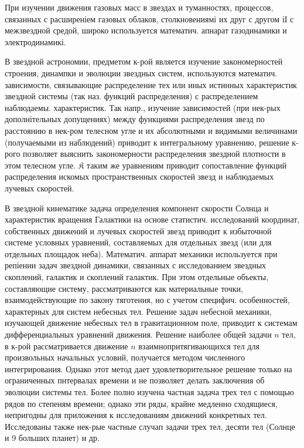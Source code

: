 \documentclass[10pt]{article}
\begin{document}
При изучении движения газовых масс в звездах и туманностях, процессов, связанных с расширеніем газовых облаков, столкновениямі их друг с другом іІ с межзвездной средой, широко используется математич. апнарат газодинамики и электродинамикі.



В звездной астрономии, предметом к-рой является изучение закономерностей строения, динампки и эволюции звездных систем, используются математич. зависимости, связывающие распределение тех или иных истинных характеристик звездной системы (так наз. функций распределения) с распределением наблюдаемы. характеристик. Так напр., изучение зависимостей (при нек-рых дополнітельных допущениях) между функциями распределения звезд по расстоянию в нек-ром телесном угле и их абсолютными и видимыми величинами (получаемыми из наблюдений) приводит к интегральному уравнению, решение к-рого позволяет выяснить закономерности распределения звездной плотности в этом телесном угле. $\mathfrak{K}$ таким же уравнениям приводит сопоставление функций распределения искомых пространственных скоростей звезд и наблюдаемых лучевых скоростей.



В звездной кинематике задача определения компонент скорости Солнца и характеристик вращения Галактики на основе статистич. исследований координат, собственных движений и лучевых скоростей звезд приводит к избыточной системе условных уравнений, составляемых для отдельных звезд (или для отдельных площадок неба). Математич. аппарат механики используется при репіении задач звездной динамики, связанных с исследованием звездных скоплений, галактик и скоплений галактик. При этом отдельные объекты, составляющие систему, рассматриваются как материальные точки, взаимодействующие по закону тяготения, но с учетом специфич. особенностей, характерных для систем небесных тел. Решение задач небесной механики, изучающей движение небесных тел в гравитационном поле, приводит к системам дифференциальных уравнений движения. Решение наиболее общей задачи $n$ тел, в к-рой рассматривается движение $n$ взаимнопритягивающихся тел для произвольных начальных условий, получается методом численного интегрирования. Однако этот метод дает удовлетворительное решение только на ограниченных пнтервалах времени и не позволяет делать заключения об эволюции системы тел. Более полно изучена частная задача трех тел с помощью рядов по степеням времени; однако эти ряды, крайне медленно сходящиеся, непригодны для приложения к исследованиям движений конкретных тел. Исследованы также нек-рые частные случап задачи трех тел, десяти тел (Солнце и 9 больших планет) и др.
\end{document}
